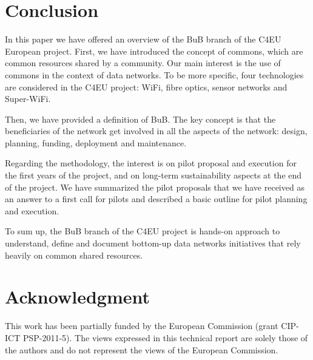 \documentclass[conference]{IEEEtran}
\begin{document}



\section{Conclusion}
\label{sec:conclusion}

In this paper we have offered an overview of the BuB branch of the C4EU European project.
First, we have introduced the concept of commons, which are common resources shared by a community.
Our main interest is the use of commons in the context of data networks.
To be more specific, four technologies are considered in the C4EU project: WiFi, fibre optics, sensor networks and Super-WiFi.

Then, we have provided a definition of BuB.
The key concept is that the beneficiaries of the network get involved in all the aspects of the network: design, planning, funding, deployment and maintenance.

Regarding the methodology, the interest is on pilot proposal and execution for the first years of the project, and on long-term sustainability aspects at the end of the project.
We have summarized the pilot proposals that we have received as an answer to a first call for pilots and described a basic outline for pilot planning and execution.

To sum up, the BuB branch of the C4EU project is hands-on approach to understand, define and document bottom-up data networks initiatives that rely heavily on common shared resources.





\section*{Acknowledgment}


This work has been partially funded by the European Commission (grant CIP-ICT PSP-2011-5).
The views expressed in this technical report are solely those of the authors and do not represent the views of the European Commission.
\end{document}
